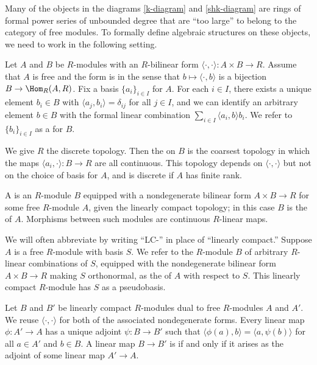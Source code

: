 Many of the objects in the diagrams \eqref{k-diagram} and \eqref{shk-diagram} 
are rings of formal power series of unbounded degree that are ``too large'' to belong to the category of free modules. To formally define algebraic structures on these objects, we need to work in the following setting.





 


 

 

Let $A$ and $B$ be $R$-modules
with an $R$-bilinear form $\langle\cdot,\cdot\rangle : A \times B \to R$.
Assume that $A$ is free and the form
is  in the sense that
$b\mapsto \langle \cdot,b\rangle$ is a bijection $B\to \Hom_R(A,R)$.
%
Fix a basis $\{a_i\}_{i \in I}$ for $A$.
For each $i \in I$, there exists a unique element $b_i \in B$ with
$\langle a_j, b_i \rangle = \delta_{ij}$ for all $j \in I$,
and we can identify an arbitrary element $b \in B$
with the formal linear combination $\sum_{i \in I} \langle a_i ,b\rangle b_i$.
We refer to $\{b_i\}_{i \in I}$ as a  for $B$.

We give $R$ the discrete topology.
Then the  \cite[\S I.2]{Dieudonne} on $B$ is the coarsest topology 
in which the maps $\langle a_i, \cdot \rangle : B \to R$ are all continuous.
This topology depends on $\langle\cdot,\cdot\rangle$ but not on the choice of basis for $A$,
and is discrete if $A$ has finite rank.




\begin{definition}
A  is an $R$-module $B$ equipped with a nondegenerate
bilinear form $A \times B \to R$ for some free $R$-module $A$, given the linearly compact topology;
in this case  $B$ is the  of $A$.
Morphisms between such modules are continuous $R$-linear maps.
\end{definition}

 
 

We will often abbreviate by writing ``LC-'' in place of ``linearly compact.''
Suppose $A$ is a free $R$-module with basis $S$.
We refer to the
$R$-module $B$ of arbitrary $R$-linear combinations of $S$,
 equipped with the nondegenerate bilinear form
$ A \times B \to R$ making $S$ orthonormal,
as the 
 of $A$ with respect to $S$.
This linearly compact $R$-module has $S$ as a pseudobasis.


Let $B$ and $B'$ be linearly compact $R$-modules dual to free $R$-modules $A$ and $A'$.
We reuse $\langle\cdot,\cdot\rangle$ for both of the 
associated nondegenerate forms. 
Every linear map $\phi : A' \to A$ has a unique adjoint $\psi : B\to B'$ such that 
$\langle \phi(a), b\rangle = \langle a,\psi(b)\rangle$ for all $a \in A'$ and $b \in B$.
A linear map $B \to B'$ is  if and only if it arises as the adjoint 
of some linear map $A' \to A$.




